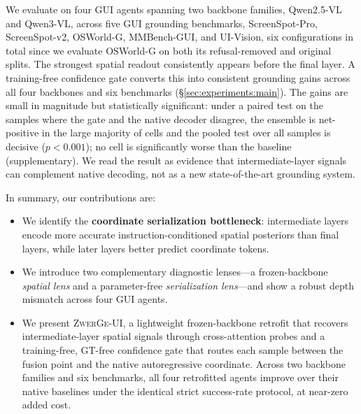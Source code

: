 We evaluate on four GUI agents spanning two backbone families, Qwen2.5-VL and Qwen3-VL, across five GUI grounding benchmarks, ScreenSpot-Pro, ScreenSpot-v2, OSWorld-G, MMBench-GUI, and UI-Vision, six configurations in total since we evaluate OSWorld-G on both its refusal-removed and original splits.
The strongest spatial readout consistently appears before the final layer.
A training-free confidence gate converts this into consistent grounding gains across all four backbones and six benchmarks (\S\ref{sec:experiments:main}).
The gains are small in magnitude but statistically significant: under a paired test on the samples where the gate and the native decoder disagree, the ensemble is net-positive in the large majority of cells and the pooled test over all samples is decisive ($p{<}0.001$); no cell is significantly worse than the baseline (supplementary).
We read the result as evidence that intermediate-layer signals can complement native decoding, not as a new state-of-the-art grounding system.

In summary, our contributions are:
\begin{itemize}
 \item We identify the \textbf{coordinate serialization bottleneck}: intermediate layers encode more accurate instruction-conditioned spatial posteriors than final layers, while later layers better predict coordinate tokens.

 \item We introduce two complementary diagnostic lenses---a frozen-backbone \emph{spatial lens} and a parameter-free \emph{serialization lens}---and show a robust depth mismatch across four GUI agents.

 \item We present \textsc{ZwerGe-UI}, a lightweight frozen-backbone retrofit that recovers intermediate-layer spatial signals through cross-attention probes and a training-free, GT-free confidence gate that routes each sample between the fusion point and the native autoregressive coordinate. Across two backbone families and six benchmarks, all four retrofitted agents improve over their native baselines under the identical strict success-rate protocol, at near-zero added cost.
\end{itemize}
